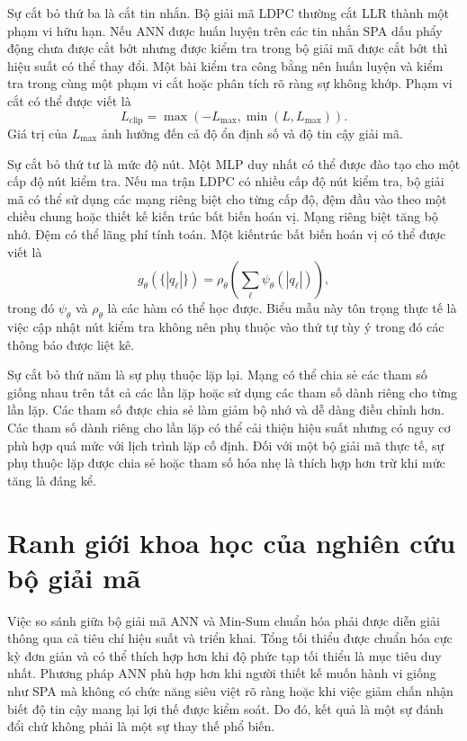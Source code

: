 Sự cắt bỏ thứ ba là cắt tin nhắn. Bộ giải mã LDPC thường cắt LLR thành một phạm vi hữu hạn. Nếu ANN được huấn luyện trên các tin nhắn SPA dấu phẩy động chưa được cắt bớt nhưng được kiểm tra trong bộ giải mã được cắt bớt thì hiệu suất có thể thay đổi. Một bài kiểm tra công bằng nên huấn luyện và kiểm tra trong cùng một phạm vi cắt hoặc phân tích rõ ràng sự không khớp. Phạm vi cắt có thể được viết là
\begin{equation}
  L_{\mathrm{clip}}=\max(-L_{\max},\min(L,L_{\max})).
\end{equation}
Giá trị của $L_{\max}$ ảnh hưởng đến cả độ ổn định số và độ tin cậy giải mã.

Sự cắt bỏ thứ tư là mức độ nút. Một MLP duy nhất có thể được đào tạo cho một cấp độ nút kiểm tra. Nếu ma trận LDPC có nhiều cấp độ nút kiểm tra, bộ giải mã có thể sử dụng các mạng riêng biệt cho từng cấp độ, đệm đầu vào theo một chiều chung hoặc thiết kế kiến ​​trúc bất biến hoán vị. Mạng riêng biệt tăng bộ nhớ. Đệm có thể lãng phí tính toán. Một kiến ​​trúc bất biến hoán vị có thể được viết là
\begin{equation}
  g_\theta(\{|q_\ell|\})=
  \rho_\theta\left(\sum_{\ell}\psi_\theta(|q_\ell|)\right),
\end{equation}
trong đó $\psi_\theta$ và $\rho_\theta$ là các hàm có thể học được. Biểu mẫu này tôn trọng thực tế là việc cập nhật nút kiểm tra không nên phụ thuộc vào thứ tự tùy ý trong đó các thông báo được liệt kê.

Sự cắt bỏ thứ năm là sự phụ thuộc lặp lại. Mạng có thể chia sẻ các tham số giống nhau trên tất cả các lần lặp hoặc sử dụng các tham số dành riêng cho từng lần lặp. Các tham số được chia sẻ làm giảm bộ nhớ và dễ dàng điều chỉnh hơn. Các tham số dành riêng cho lần lặp có thể cải thiện hiệu suất nhưng có nguy cơ phù hợp quá mức với lịch trình lặp cố định. Đối với một bộ giải mã thực tế, sự phụ thuộc lặp được chia sẻ hoặc tham số hóa nhẹ là thích hợp hơn trừ khi mức tăng là đáng kể.

\section{Ranh giới khoa học của nghiên cứu bộ giải mã}
Việc so sánh giữa bộ giải mã ANN và Min-Sum chuẩn hóa phải được diễn giải thông qua cả tiêu chí hiệu suất và triển khai. Tổng tối thiểu được chuẩn hóa cực kỳ đơn giản và có thể thích hợp hơn khi độ phức tạp tối thiểu là mục tiêu duy nhất. Phương pháp ANN phù hợp hơn khi người thiết kế muốn hành vi giống như SPA mà không có chức năng siêu việt rõ ràng hoặc khi việc giảm chấn nhận biết độ tin cậy mang lại lợi thế được kiểm soát. Do đó, kết quả là một sự đánh đổi chứ không phải là một sự thay thế phổ biến.

